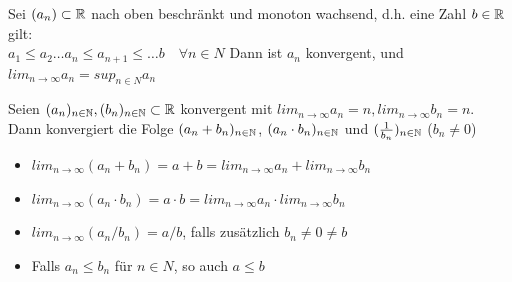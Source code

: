\documentclass[a4paper]{article}
\begin{document}
	\begin{fsatz}
		Sei $(a_n) \subset \mathbb{R}$ nach oben beschränkt und monoton
		wachsend, d.h. eine Zahl $b \in \mathbb{R}$ gilt:\\
		$a_1 \leq a_2 \ldots a_n \leq a_{n+1} \leq \ldots b \quad \forall n \in
		N$ Dann ist $a_n$ konvergent, und $lim_{n \to \infty} a_n = sup_{n \in N} a_n$
	\end{fsatz}

	\begin{fregeln}
		Seien $(a_n)_{n \in \mathbb{N}}, (b_n)_{n\in \mathbb{N}} \subset \mathbb{R}$ konvergent mit
		$lim_{n \to \infty} a_n=n, lim_{n\to\infty}b_n=n$.\\
		Dann konvergiert die Folge $(a_n+b_n)_{n\in \mathbb{N}}$, $(a_n \cdot b_n)_{n\in \mathbb{N}}$
		und $(\frac{1}{b_n})_{n \in \mathbb{N}}$ ($b_n \neq 0$)
			\begin{itemize}
				\item $lim_{n \to \infty} (a_n + b_n) = a+b=lim_{n\to\infty} a_n + lim_{n\to\infty}b_n$
				\vspace{-2mm}
				\item $lim_{n \to\infty} (a_n\cdot b_n) = a\cdot b= lim_{n\to\infty} a_n \cdot lim_{n\to\infty} b_n$
				\vspace{-2mm}
				\item $lim_{n\to\infty} (a_n/b_n) = a/b$, falls
				zusätzlich $b_n\ne 0 \ne b$
				\vspace{-2mm}
				\item Falls $a_n \leq b_n$ für $n\in N$, so auch $a \leq b$
				\vspace{-2mm}
			\end{itemize}
		
	\end{fregeln}
\end{document}
